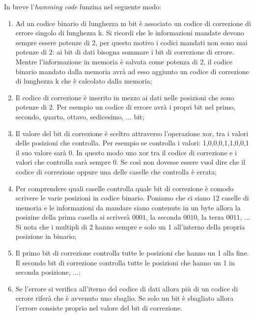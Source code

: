 \documentclass{article}
\begin{document}
In breve l'\textit{hamming code} funzina nel seguente modo:
\begin{enumerate}
	\item Ad un codice binario di lunghezza m bit è associato un codice di correzione di errore singolo di lunghezza k. Si ricordi che le informazioni mandate devono sempre essere potenze di 2, per questo motivo i codici mandati non sono mai potenze di 2: ai bit di dati bisogna sommare i bit di correzione di errore. Mentre l'informazione in memoria è salvata come potenza di 2, il codice binario mandato dalla memoria avrà ad esso aggiunto un codice di correzione di lunghezza k che è calcolato dalla memoria;

  \item Il codice di correzione è inserito in mezzo ai dati nelle posizioni che sono potenze di 2. Per esempio un codice di errore avrà i propri bit nel primo, secondo, quarto, ottavo, sedicesimo, ... bit;

	\item Il valore del bit di correzione è sceltro attraverso l'operazione xor, tra i valori delle posizioni che controlla. Per esempio se controlla i valori: 1,0,0,0,1,1,0,0,1 il suo valore sarà 0. In questo modo uno xor tra il codice di correzione e i valori che controlla sarà sempre 0. Se così non dovesse essere vuol dire che il codice di correzione oppure una delle caselle che controlla è errata;

	\item Per comprendere quali caselle controlla quale bit di correzione è comodo scrivere le varie posizioni in codice binario. Poniamo che ci siano 12 caselle di memoria e le informazioni da mandare siano contenute in un byte allora la posizine della prima casella si scriverà $0001$, la seconda $0010$, la terza $0011$, ...
	Si nota che i multipli di 2 hanno sempre e solo un 1 all'interno della propria posizione in binario;

	\item Il primo bit di correzione controlla tutte le posizioni che hanno un 1 alla fine. Il secondo bit di correzione controlla tutte le posizioni che hanno un 1 in seconda posizione, ...;

	\item Se l'errore si verifica all'iterno del codice di dati allora più di un codice di errore riferà che è avvenuto uno sbaglio. Se solo un bit è sbagliato allora l'errore consiste proprio nel valore del bit di correzione.

\end{enumerate}
\end{document}
